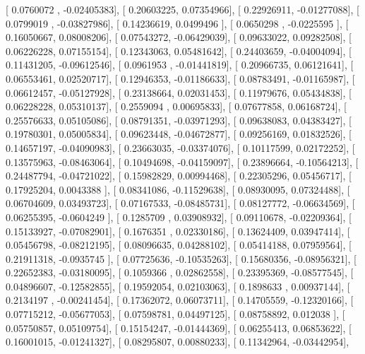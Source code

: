 \documentclass{article}
\begin{document}
       [ 0.0760072 , -0.02405383],
       [ 0.20603225,  0.07354966],
       [ 0.22926911, -0.01277088],
       [ 0.0799019 , -0.03827986],
       [ 0.14236619,  0.0499496 ],
       [ 0.0650298 , -0.0225595 ],
       [ 0.16050667,  0.08008206],
       [ 0.07543272, -0.06429039],
       [ 0.09633022,  0.09282508],
       [ 0.06226228,  0.07155154],
       [ 0.12343063,  0.05481642],
       [ 0.24403659, -0.04004094],
       [ 0.11431205, -0.09612546],
       [ 0.0961953 , -0.01441819],
       [ 0.20966735,  0.06121641],
       [ 0.06553461,  0.02520717],
       [ 0.12946353, -0.01186633],
       [ 0.08783491, -0.01165987],
       [ 0.06612457, -0.05127928],
       [ 0.23138664,  0.02031453],
       [ 0.11979676,  0.05434838],
       [ 0.06228228,  0.05310137],
       [ 0.2559094 ,  0.00695833],
       [ 0.07677858,  0.06168724],
       [ 0.25576633,  0.05105086],
       [ 0.08791351, -0.03971293],
       [ 0.09638083,  0.04383427],
       [ 0.19780301,  0.05005834],
       [ 0.09623448, -0.04672877],
       [ 0.09256169,  0.01832526],
       [ 0.14657197, -0.04090983],
       [ 0.23663035, -0.03374076],
       [ 0.10117599,  0.02172252],
       [ 0.13575963, -0.08463064],
       [ 0.10494698, -0.04159097],
       [ 0.23896664, -0.10564213],
       [ 0.24487794, -0.04721022],
       [ 0.15982829,  0.00994468],
       [ 0.22305296,  0.05456717],
       [ 0.17925204,  0.0043388 ],
       [ 0.08341086, -0.11529638],
       [ 0.08930095,  0.07324488],
       [ 0.06704609,  0.03493723],
       [ 0.07167533, -0.08485731],
       [ 0.08127772, -0.06634569],
       [ 0.06255395, -0.0604249 ],
       [ 0.1285709 ,  0.03908932],
       [ 0.09110678, -0.02209364],
       [ 0.15133927, -0.07082901],
       [ 0.1676351 ,  0.02330186],
       [ 0.13624409,  0.03947414],
       [ 0.05456798, -0.08212195],
       [ 0.08096635,  0.04288102],
       [ 0.05414188,  0.07959564],
       [ 0.21911318, -0.0935745 ],
       [ 0.07725636, -0.10535263],
       [ 0.15680356, -0.08956321],
       [ 0.22652383, -0.03180095],
       [ 0.1059366 ,  0.02862558],
       [ 0.23395369, -0.08577545],
       [ 0.04896607, -0.12582855],
       [ 0.19592054,  0.02103063],
       [ 0.1898633 ,  0.00937144],
       [ 0.2134197 , -0.00241454],
       [ 0.17362072,  0.06073711],
       [ 0.14705559, -0.12320166],
       [ 0.07715212, -0.05677053],
       [ 0.07598781,  0.04497125],
       [ 0.08758892,  0.012038  ],
       [ 0.05750857,  0.05109754],
       [ 0.15154247, -0.01444369],
       [ 0.06255413,  0.06853622],
       [ 0.16001015, -0.01241327],
       [ 0.08295807,  0.00880233],
       [ 0.11342964, -0.03442954],
\end{document}
